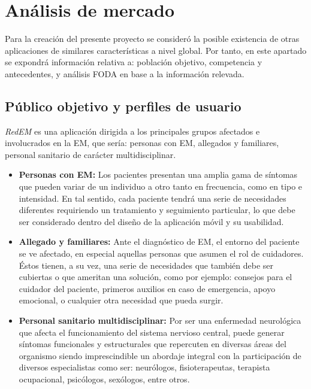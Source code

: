             



\section{Análisis de mercado}
Para la creación del presente proyecto se consideró la posible existencia de otras aplicaciones de similares características a nivel global. Por tanto, en este apartado se expondrá información relativa a: población objetivo, competencia y antecedentes, y análisis FODA en base a la información relevada.

\subsection{Público objetivo y perfiles de usuario}
\emph{RedEM} es una aplicación dirigida a los principales grupos afectados e involucrados en la EM, que sería: personas con EM, allegados y familiares, personal sanitario de carácter multidisciplinar.

\begin{itemize}
    \item 
    \textbf{Personas con EM:} Los pacientes presentan una amplia gama de síntomas que pueden variar de un individuo a otro tanto en frecuencia, como en tipo e intensidad. En tal sentido, cada paciente tendrá una serie de necesidades diferentes requiriendo un tratamiento y seguimiento particular, lo que debe ser considerado dentro del diseño de la aplicación móvil y su usabilidad.
    \item 
    \textbf{Allegado y familiares:} Ante el diagnóstico de EM, el entorno del paciente se ve afectado, en especial aquellas personas que asumen el rol de cuidadores. Éstos tienen, a su vez, una serie de necesidades que también debe ser cubiertas o que ameritan una solución, como por ejemplo: consejos para el cuidador del paciente, primeros auxilios en caso de emergencia, apoyo emocional, o cualquier otra necesidad que pueda surgir.
   \item 
   \textbf{Personal sanitario multidisciplinar:} Por ser una enfermedad neurológica que afecta el funcionamiento del sistema nervioso central, puede generar síntomas funcionales y estructurales que repercuten en diversas áreas del organismo siendo imprescindible un abordaje integral con la participación de diversos especialistas como ser: neurólogos, fisioterapeutas, terapista ocupacional, psicólogos, sexólogos, entre otros.  
\end{itemize} 


